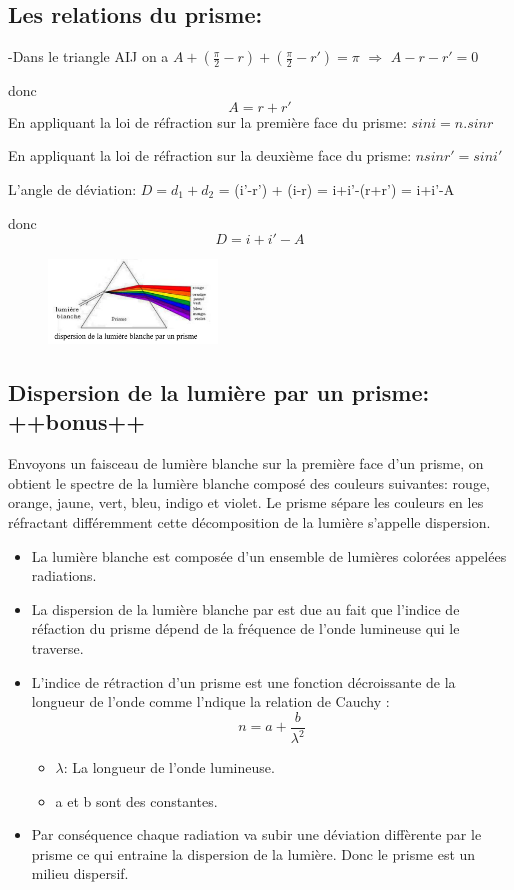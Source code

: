 \documentclass[12pt]{article}
\begin{document}
\subsection{Les relations du prisme: }

-Dans le triangle AIJ on a $A +(\frac{\pi}{2} - r) + (\frac{\pi}{2} - r') = \pi $ $\Rightarrow$ $A-r-r' = 0$ 

donc $$A=r+r'$$
En appliquant la loi de réfraction sur la première face du prisme: $sin i = n.sin r$

En appliquant la loi de réfraction sur la deuxième face du prisme: $nsin r' = sin i'$

L'angle de déviation: $D =d_1 + d_2$ = (i'-r') + (i-r) = i+i'-(r+r') = i+i'-A

donc $$D = i + i' -A $$
\begin{figure}
	\vspace{-1.2cm}
	\includegraphics[width=0.4\textwidth]{./img/OLdispersionPrisme.png}
\end{figure}


\subsection{Dispersion de la lumière par un prisme: ++bonus++ }

Envoyons un faisceau de lumière blanche sur la première face d'un prisme, on obtient le spectre de la lumière blanche composé des
couleurs suivantes: rouge, orange, jaune, vert, bleu, indigo et violet.
Le prisme sépare les couleurs en les réfractant différemment cette décomposition de la lumière s'appelle dispersion.
\begin{itemize}
	\item La lumière blanche est composée d'un ensemble de lumières colorées appelées radiations.

	\item La dispersion de la lumière blanche par est due au fait que l'indice de réfaction du prisme dépend de la fréquence de l'onde lumineuse qui le traverse. 

	\item L'indice de rétraction d'un prisme est une fonction décroissante de la longueur de l'onde comme l'ndique
la relation de Cauchy  : $$n = a + \frac{b}{\lambda^2}$$
\begin{itemize}
	\item $\lambda$: La longueur de l'onde lumineuse.
	\item a et b sont des constantes.
	\end{itemize}
\item Par conséquence chaque radiation va subir une déviation diffèrente par le prisme ce qui entraine la dispersion de la lumière.
Donc le prisme est un milieu dispersif.

\end{itemize}
\end{document}

